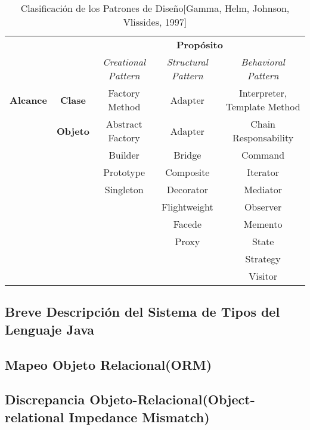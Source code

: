 \begin{center}
    \begin{table}[H]
        \begin{tabular}{|c|c|c|c|c|}
            \cline{3-5}
            \multicolumn{1}{c}{} & \multicolumn{1}{c|}{} & \multicolumn{3}{c|}{\textbf{Propósito}}\\
            \cline{3-5}
            \multicolumn{1}{c}{} & \multicolumn{1}{c|}{} & \multicolumn{1}{c|}{\textit{Creational Pattern}} &
                                   \multicolumn{1}{c|}{\textit{Structural Pattern}} &
                                   \multicolumn{1}{c|}{\textit{Behavioral Pattern}}\\
            \hline
            \textbf{Alcance} & \textbf{Clase}  & Factory Method   & Adapter      & Interpreter, \newline Template Method\\ \cline{2-5}
                             & \textbf{Objeto} & Abstract Factory & Adapter      & Chain Responsability\\
                             &                 & Builder          & Bridge       & Command \\
                             &                 & Prototype        & Composite    & Iterator\\
                             &                 & Singleton        & Decorator    & Mediator\\
                             &                 &                  & Flightweight & Observer\\
                             &                 &                  & Facede       & Memento\\
                             &                 &                  & Proxy        & State\\
                             &                 &                  &              & Strategy\\
                             &                 &                  &              & Visitor\\
            \hline
        \end{tabular}
        \caption{Clasificación de los Patrones de Diseño[Gamma, Helm, Johnson, Vlissides, 1997]}
    \end{table}
\end{center}
\subsection{Breve Descripción del Sistema de Tipos del Lenguaje Java}
\subsection{Mapeo Objeto Relacional(ORM)}
\subsection{Discrepancia Objeto-Relacional(Object-relational Impedance Mismatch)}
\noindent